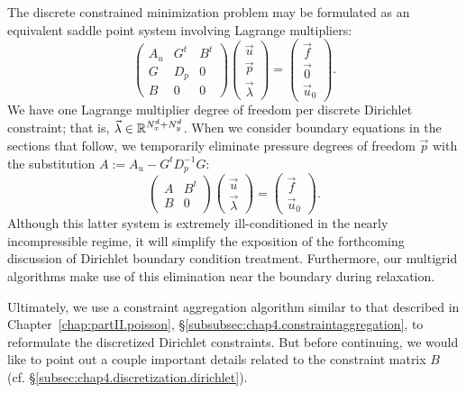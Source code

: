 The discrete constrained minimization problem may be formulated as an equivalent saddle point system involving Lagrange multipliers:
\begin{equation} \label{eq:chap5.kkt.augmented}
\begin{pmatrix} A_u & G^t & B^t \\ G & D_p & 0 \\ B & 0 & 0 \end{pmatrix}
\begin{pmatrix} \vec{u} \\ \vec{p} \\ \vec{\lambda} \end{pmatrix}
= \begin{pmatrix} \vec{f} \\ \vec{0} \\ \vec{u}_0 \end{pmatrix}.
\end{equation}
We have one Lagrange multiplier degree of freedom per discrete Dirichlet constraint; that is, $\vec{\lambda} \in \mathbb{R}^{N^d_x + N^d_y}$. When we consider boundary equations in the sections that follow, we temporarily eliminate pressure degrees of freedom $\vec{p}$ with the substitution $A := A_u - G^t D_p^{-1} G$:
\begin{equation} \label{eq:chap5.kkt.unaugmented}
\begin{pmatrix} A & B^t \\ B & 0 \end{pmatrix}
\begin{pmatrix} \vec{u} \\ \vec{\lambda} \end{pmatrix}
= \begin{pmatrix} \vec{f} \\ \vec{u}_0 \end{pmatrix}.
\end{equation}
Although this latter system is extremely ill-conditioned in the nearly incompressible regime, it will simplify the exposition of the forthcoming discussion of Dirichlet boundary condition treatment. Furthermore, our multigrid algorithms make use of this elimination near the boundary during relaxation.

Ultimately, we use a constraint aggregation algorithm similar to that described in Chapter~\ref{chap:partII.poisson}, \S\ref{subsubsec:chap4.constraintaggregation}, to reformulate the discretized Dirichlet constraints. But before continuing, we would like to point out a couple important details related to the constraint matrix $B$ (cf. \S\ref{subsec:chap4.discretization.dirichlet}).


